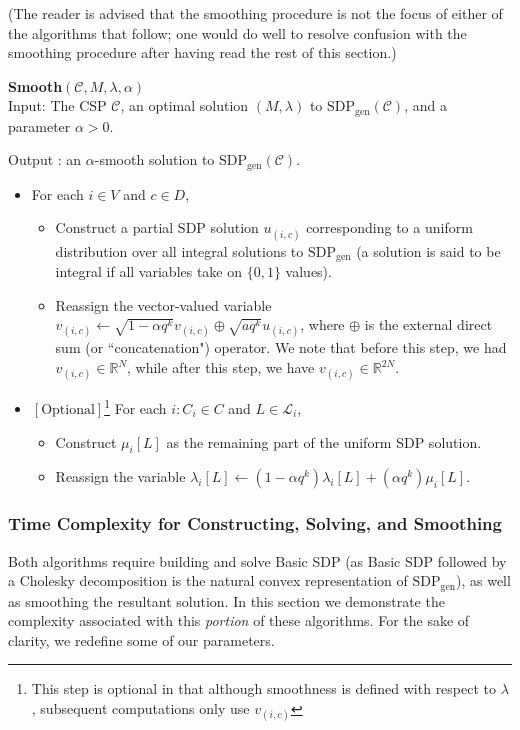  (The reader is advised that the smoothing procedure is not the focus of either of the algorithms that follow; one would do well to resolve confusion with the smoothing procedure after having read the rest of this section.)

\begin{algorithm}\textbf{Smooth$(\mathcal{C},M,\lambda, \alpha)$} \\

Input: The CSP $\mathcal{C}$, an optimal solution $(M,\lambda)$ to $\text{SDP}_{\text{gen}}(\mathcal{C})$, and a parameter $\alpha > 0$. 

Output : an $\alpha$-smooth solution to $\text{SDP}_{\text{gen}}(\mathcal{C})$.
\begin{itemize}
\item For each $i \in V$ and $c \in D$,
	\begin{itemize}
	\item Construct a partial SDP solution $u_{(i,c)}$ corresponding to a uniform distribution over all integral
	 solutions to
	$\text{SDP}_{\text{gen}}$ (a solution is said to be integral if all variables take on $\{0,1\}$ values).
	\item Reassign the vector-valued variable $v_{(i,c)} \leftarrow \sqrt{1-\alpha q^k} v_{(i,c)} \oplus \sqrt{aq^k}
	u_{(i,c)}$, where $\oplus$ is the external direct sum (or ``concatenation") operator. We note that before this step, we had	
	$v_{(i,c)} \in \mathbb{R}^N$, while after this step, we have $v_{(i,c)} \in \mathbb{R}^{2N}$.
	\end{itemize}
\item $\left[\text{Optional}\right]$\footnote{This step is optional in that although smoothness is defined with respect to $\lambda$, subsequent computations only use $v_{(i,c)}$} For each $i : C_i \in C$ and $L \in \mathcal{L}_i$,
	\begin{itemize}
	\item  Construct $\mu_i[L]$ as the remaining part of the uniform SDP solution.
	\item Reassign the variable $\lambda_i[L] \leftarrow (1-\alpha q^k)\lambda_{i}[L] + (\alpha q^k)\mu_i[L]$. 
	\end{itemize}
\end{itemize}
\end{algorithm}

\subsubsection{Time Complexity for Constructing, Solving, and Smoothing}\label{subsec:buildSolveSmooth}
Both algorithms require building and solve Basic SDP (as Basic SDP followed by a Cholesky decomposition is the natural convex representation of $\text{SDP}_{\text{gen}}$), as well as smoothing the resultant solution. In this section we demonstrate the complexity associated with this \textit{portion} of these algorithms. For the sake of clarity, we redefine some of our parameters.

